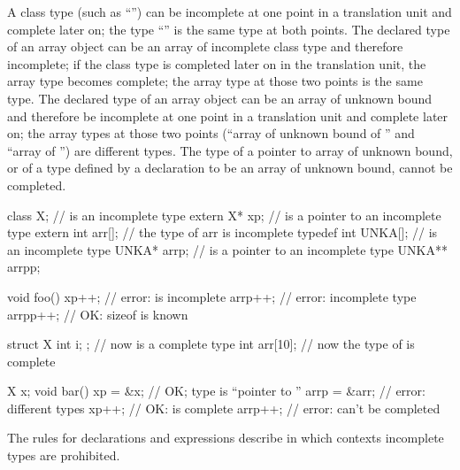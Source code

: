 \pnum
A class type (such as ``'') can be incomplete at one
point in a translation unit and complete later on; the type
``'' is the same type at both points. The declared type
of an array object can be an array of incomplete class type and
therefore incomplete; if the class type is completed later on in the
translation unit, the array type becomes complete; the array type at
those two points is the same type. The declared type of an array object
can be an array of unknown bound and therefore be incomplete at one
point in a translation unit and complete later on; the array types at
those two points (``array of unknown bound of '' and ``array of
 '') are different types. The type of a pointer to array of
unknown bound, or of a type defined by a  declaration to
be an array of unknown bound, cannot be completed.
\begin{example}
%
\begin{codeblock}
class X;                        //  is an incomplete type
extern X* xp;                   //  is a pointer to an incomplete type
extern int arr[];               // the type of arr is incomplete
typedef int UNKA[];             //  is an incomplete type
UNKA* arrp;                     //  is a pointer to an incomplete type
UNKA** arrpp;

void foo() {
  xp++;                         // error:  is incomplete
  arrp++;                       // error: incomplete type
  arrpp++;                      // OK: sizeof  is known
}

struct X { int i; };            // now  is a complete type
int  arr[10];                   // now the type of  is complete

X x;
void bar() {
  xp = &x;                      // OK; type is ``pointer to ''
  arrp = &arr;                  // error: different types
  xp++;                         // OK:   is complete
  arrp++;                       // error:  can't be completed
}
\end{codeblock}
\end{example}

\pnum
\begin{note}
The rules for declarations and expressions describe in which
contexts incomplete types are prohibited.
\end{note}

